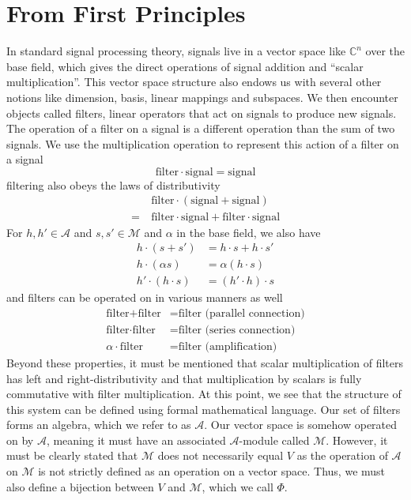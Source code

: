 \documentclass[12pt,technote]{IEEEtran}
\begin{document}
\section{From First Principles}
In standard signal processing theory, signals live in a vector space like $\mathbb{C}^n$ over the base field, which gives the direct operations of signal addition and ``scalar multiplication''. This vector space structure also endows us with several other notions like dimension, basis, linear mappings and subspaces. We then encounter objects called filters, linear operators that act on signals to produce new signals. The operation of a filter on a signal is a different operation than the sum of two signals. We use the multiplication operation to represent this action of a filter on a signal
\begin{equation*}
    \text{filter}\cdot\text{signal} = \text{signal}
\end{equation*}
filtering also obeys the laws of distributivity
\begin{align*}
    &\text{filter}\cdot (\text{signal} + \text{signal}) \\
    =\ &\text{filter}\cdot \text{signal} + \text{filter}\cdot\text{signal}
\end{align*}
For $h,h'\in \mathcal{A}$ and $s,s'\in\mathcal{M}$ and $\alpha$ in the base field, we also have
\begin{align*}
    h\cdot (s + s') &= h\cdot s + h\cdot s'\\
    h\cdot (\alpha s) &= \alpha (h\cdot s)\\
    h'\cdot (h\cdot s) &= (h'\cdot h)\cdot s
\end{align*}
and filters can be operated on in various manners as well
\begin{align*}
    \text{filter} + \text{filter} &= \text{filter (parallel connection)}\\
    \text{filter} \cdot \text{filter} &= \text{filter (series connection)}\\
    \alpha\cdot\text{filter} &= \text{filter (amplification)}
\end{align*}
Beyond these properties, it must be mentioned that scalar multiplication of filters has left and right-distributivity and that multiplication by scalars is fully commutative with filter multiplication.
At this point, we see that the structure of this system can be defined using formal mathematical language. Our set of filters forms an algebra, which we refer to as $\mathcal{A}$. Our vector space is somehow operated on by $\mathcal{A}$, meaning it must have an associated $\mathcal{A}$-module called $\mathcal{M}$. However, it must be clearly stated that $\mathcal{M}$ does not necessarily equal $V$ as the operation of $\mathcal{A}$ on $\mathcal{M}$ is not strictly defined as an operation on a vector space. Thus, we must also define a bijection between $V$ and $\mathcal{M}$, which we call $\Phi$.
\end{document}
